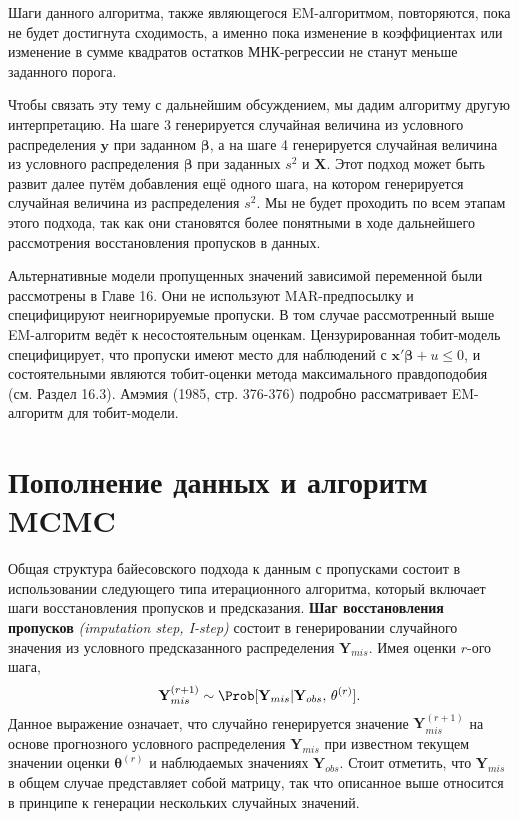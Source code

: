 Шаги данного алгоритма,  также являющегося EM-алгоритмом, повторяются, пока не будет достигнута сходимость, а именно пока изменение в коэффициентах или изменение в сумме квадратов остатков МНК-регрессии не станут меньше заданного порога.

Чтобы связать эту тему с дальнейшим обсуждением, мы дадим алгоритму другую интерпретацию. На шаге 3 генерируется случайная величина из условного распределения $\mathbf{y}$ при заданном $\mathbf{\beta}$, а на шаге 4 генерируется случайная величина из условного распределения $\mathbf{\beta}$ при заданных $s^2$ и $\mathbf{X}$. Этот подход может быть развит далее  путём добавления ещё одного шага, на котором генерируется случайная величина из распределения $s^2$. Мы не будет проходить по всем этапам этого подхода, так как они становятся более понятными в ходе дальнейшего рассмотрения восстановления пропусков в данных.

Альтернативные модели пропущенных значений зависимой переменной были рассмотрены в Главе 16. Они не используют MAR-предпосылку и специфицируют неигнорируемые пропуски. В том случае  рассмотренный выше EM-алгоритм ведёт к несостоятельным оценкам. Цензурированная тобит-модель специфицирует, что пропуски имеют место  для наблюдений с $\mathbf{x'\beta}+u \leqslant 0$, и состоятельными являются тобит-оценки метода максимального правдоподобия (см. Раздел 16.3). Амэмия (1985, стр. 376-376) подробно рассматривает EM-алгоритм для тобит-модели.

\section{Пополнение данных и алгоритм MCMC}
Общая структура байесовского подхода к  данным с пропусками состоит в использовании следующего типа итерационного алгоритма, который включает шаги восстановления пропусков и предсказания. 
{\bf Шаг восстановления пропусков} \emph{(imputation step, I-step)} состоит в генерировании случайного значения из условного предсказанного распределения $\mathbf{Y}_{mis}$. Имея оценки $r$-ого шага,
\begin{equation}
\mathbf{Y}_{mis}^{(r+1)} \sim \Prob[\mathbf{Y}_{mis}|\mathbf{Y}_{obs}, \, \mathbf{\theta}^{(r)}].
\end{equation}
Данное выражение означает, что  случайно генерируется значение $\mathbf{Y}_{mis}^{(r+1)}$ на основе прогнозного условного распределения $\mathbf{Y}_{mis}$ при известном текущем значении оценки $\mathbf{\theta}^{(r)}$ и наблюдаемых значениях $\mathbf{Y}_{obs}$. Стоит отметить, что $\mathbf{Y}_{mis}$ в общем случае представляет собой матрицу, так что описанное выше относится  в принципе к генерации нескольких случайных значений.

